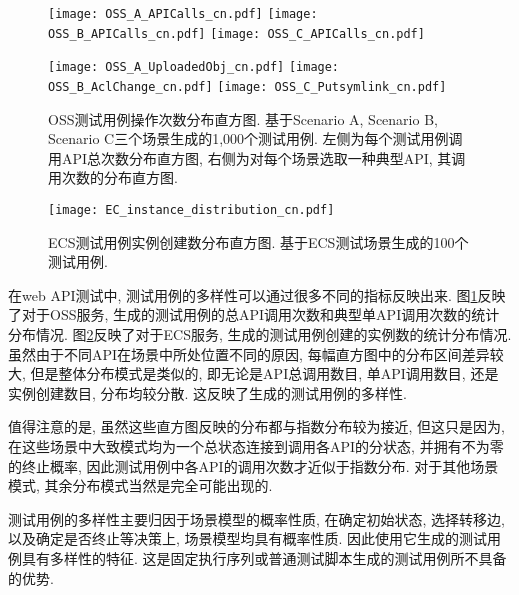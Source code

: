             \begin{figure}[!htb]
                \begin{minipage}{0.5\textwidth}
                    \centering
                    \texttt{[image: OSS\_A\_APICalls\_cn.pdf]}
                    \texttt{[image: OSS\_B\_APICalls\_cn.pdf]}
                    \texttt{[image: OSS\_C\_APICalls\_cn.pdf]}
                \end{minipage}
                \begin{minipage}{0.5\textwidth}
                    \centering
                    \texttt{[image: OSS\_A\_UploadedObj\_cn.pdf]}
                    \texttt{[image: OSS\_B\_AclChange\_cn.pdf]}
                    \texttt{[image: OSS\_C\_Putsymlink\_cn.pdf]}
                \end{minipage}
                \caption{OSS测试用例操作次数分布直方图. 基于Scenario A, Scenario B, Scenario C三个场景生成的1,000个测试用例. 左侧为每个测试用例调用API总次数分布直方图, 右侧为对每个场景选取一种典型API, 其调用次数的分布直方图.}
                \label{fig:OSS_stat}
            \end{figure}
            
            \begin{figure}[!htb]
                \centering
                \texttt{[image: EC\_instance\_distribution\_cn.pdf]}
                \caption{ECS测试用例实例创建数分布直方图. 基于ECS测试场景生成的100个测试用例.}
                \label{fig:ECS_stat}
            \end{figure}
            
            在web API测试中, 测试用例的多样性可以通过很多不同的指标反映出来. 图\ref{fig:OSS_stat}反映了对于OSS服务, 生成的测试用例的总API调用次数和典型单API调用次数的统计分布情况. 图\ref{fig:ECS_stat}反映了对于ECS服务, 生成的测试用例创建的实例数的统计分布情况. 虽然由于不同API在场景中所处位置不同的原因, 每幅直方图中的分布区间差异较大, 但是整体分布模式是类似的, 即无论是API总调用数目, 单API调用数目, 还是实例创建数目, 分布均较分散. 这反映了生成的测试用例的多样性.
            
            值得注意的是, 虽然这些直方图反映的分布都与指数分布较为接近, 但这只是因为, 在这些场景中大致模式均为一个总状态连接到调用各API的分状态, 并拥有不为零的终止概率, 因此测试用例中各API的调用次数才近似于指数分布. 对于其他场景模式, 其余分布模式当然是完全可能出现的.
            
            测试用例的多样性主要归因于场景模型的概率性质, 在确定初始状态, 选择转移边, 以及确定是否终止等决策上, 场景模型均具有概率性质. 因此使用它生成的测试用例具有多样性的特征. 这是固定执行序列或普通测试脚本生成的测试用例所不具备的优势.

